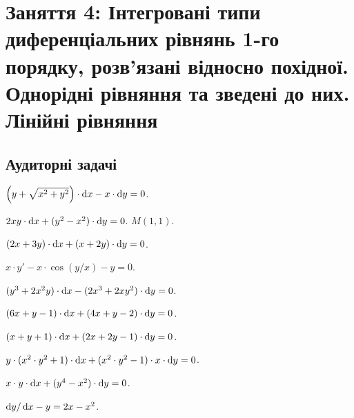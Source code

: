 \section*{Заняття 4: Інтегровані типи диференціальних рівнянь 1-го порядку, розв'язані відносно похідної. Однорідні рівняння та зведені до них. Лінійні рівняння}

\subsection*{Аудиторні задачі}

\begin{problem}
	$\left( y + \sqrt{x^2 + y^2} \right) \cdot \mathop{}\!\mathrm{d} x - x \cdot \mathop{}\!\mathrm{d} y = 0$.
\end{problem}

\begin{problem}
	$2 x y \cdot \mathop{}\!\mathrm{d} x + (y^2 - x^2) \cdot \mathop{}\!\mathrm{d} y = 0$.  $M(1,1)$.
\end{problem}

\begin{problem}
	$(2 x + 3 y) \cdot \mathop{}\!\mathrm{d} x + (x + 2 y) \cdot \mathop{}\!\mathrm{d} y = 0$.
\end{problem}

\begin{problem}
	$x \cdot y' - x \cdot \cos (y / x) - y = 0$.
\end{problem}

\begin{problem}
	$(y^3 + 2 x^2 y) \cdot \mathop{}\!\mathrm{d} x - (2 x^3 + 2 x y^2) \cdot \mathop{}\!\mathrm{d} y = 0$.
\end{problem}

\begin{problem}
	$(6 x + y - 1) \cdot \mathop{}\!\mathrm{d} x + (4 x + y - 2) \cdot \mathop{}\!\mathrm{d} y = 0$.
\end{problem}

\begin{problem}
	$(x + y + 1) \cdot \mathop{}\!\mathrm{d} x + (2 x + 2 y - 1) \cdot \mathop{}\!\mathrm{d} y = 0$.
\end{problem}

\begin{problem}
	$y \cdot (x^2 \cdot y^2 + 1) \cdot \mathop{}\!\mathrm{d} x + (x^2 \cdot y^2 - 1) \cdot x \cdot \mathop{}\!\mathrm{d} y = 0$.
\end{problem}

\begin{problem}
	$x \cdot y \cdot \mathop{}\!\mathrm{d} x + (y^4 - x^2) \cdot \mathop{}\!\mathrm{d} y = 0$.
\end{problem}

\begin{problem}
	$\mathop{}\!\mathrm{d} y / \mathop{}\!\mathrm{d} x - y = 2 x - x^2$.
\end{problem}


